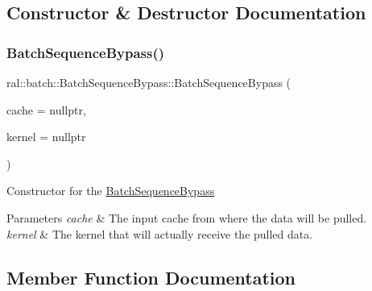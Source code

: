 \subsection{Constructor \& Destructor Documentation}
\mbox{\label{classral_1_1batch_1_1BatchSequenceBypass_aece145bb27dd1aa61252a831b8d0b536}} 
\subsubsection{\texorpdfstring{Batch\+Sequence\+Bypass()}{BatchSequenceBypass()}}
{\footnotesize\ttfamily ral\+::batch\+::\+Batch\+Sequence\+Bypass\+::\+Batch\+Sequence\+Bypass (\begin{DoxyParamCaption}\item[{std\+::shared\+\_\+ptr$<$ \hyperlink{classral_1_1cache_1_1CacheMachine}{ral\+::cache\+::\+Cache\+Machine} $>$}]{cache = {\ttfamily nullptr},  }\item[{const \hyperlink{classral_1_1cache_1_1kernel}{ral\+::cache\+::kernel} $\ast$}]{kernel = {\ttfamily nullptr} }\end{DoxyParamCaption})}

Constructor for the \hyperlink{classral_1_1batch_1_1BatchSequenceBypass}{Batch\+Sequence\+Bypass} 
\begin{DoxyParams}{Parameters}
{\em cache} & The input cache from where the data will be pulled. \\
\hline
{\em kernel} & The kernel that will actually receive the pulled data. \\
\hline
\end{DoxyParams}


\subsection{Member Function Documentation}
\mbox{\label{classral_1_1batch_1_1BatchSequenceBypass_a221ad94710394f83ebbeeabcc1851b22}} 
